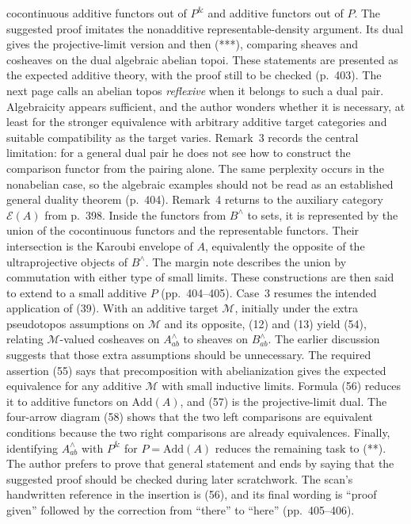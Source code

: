 cocontinuous additive functors out of $P^{\&}$ and additive functors out of $P$. The suggested proof imitates the nonadditive representable-density argument. Its dual gives the projective-limit version and then (***), comparing sheaves and cosheaves on the dual algebraic abelian topoi. These statements are presented as the expected additive theory, with the proof still to be checked (p.\ 403). The next page calls an abelian topos \emph{reflexive} when it belongs to such a dual pair. Algebraicity appears sufficient, and the author wonders whether it is necessary, at least for the stronger equivalence with arbitrary additive target categories and suitable compatibility as the target varies. Remark~3 records the central limitation: for a general dual pair he does not see how to construct the comparison functor from the pairing alone. The same perplexity occurs in the nonabelian case, so the algebraic examples should not be read as an established general duality theorem (p.\ 404). Remark~4 returns to the auxiliary category $\mathcal E(A)$ from p.\ 398. Inside the functors from $B^\wedge$ to sets, it is represented by the union of the cocontinuous functors and the representable functors. Their intersection is the Karoubi envelope of $A$, equivalently the opposite of the ultraprojective objects of $B^\wedge$. The margin note describes the union by commutation with either type of small limits. These constructions are then said to extend to a small additive $P$ (pp.\ 404--405). Case~3 resumes the intended application of (39). With an additive target $\mathcal M$, initially under the extra pseudotopos assumptions on $\mathcal M$ and its opposite, (12) and (13) yield (54), relating $\mathcal M$-valued cosheaves on $A^\wedge_{ab}$ to sheaves on $B^\wedge_{ab}$. The earlier discussion suggests that those extra assumptions should be unnecessary. The required assertion (55) says that precomposition with abelianization gives the expected equivalence for any additive $\mathcal M$ with small inductive limits. Formula (56) reduces it to additive functors on $\mathrm{Add}(A)$, and (57) is the projective-limit dual. The four-arrow diagram (58) shows that the two left comparisons are equivalent conditions because the two right comparisons are already equivalences. Finally, identifying $A^\wedge_{ab}$ with $P^{\&}$ for $P=\mathrm{Add}(A)$ reduces the remaining task to (**). The author prefers to prove that general statement and ends by saying that the suggested proof should be checked during later scratchwork. The scan's handwritten reference in the insertion is (56), and its final wording is “proof given” followed by the correction from “there” to “here” (pp.\ 405--406).

